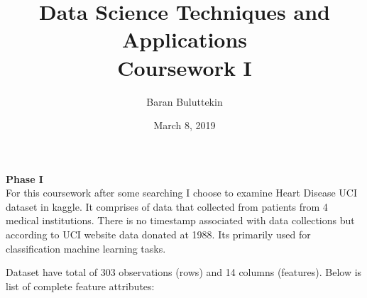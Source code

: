 \documentclass[12pt]{article}
\begin{document}
\author{Baran Buluttekin}
\title{Data Science Techniques and Applications\\Coursework I}
\date{March 8, 2019}
\maketitle

\medskip
\textbf{Phase I}\\
\indent For this coursework after some searching I choose to examine Heart Disease UCI dataset in kaggle. It comprises of data that collected from patients from 4 medical institutions. There is no timestamp associated with data collections but according to UCI website data donated at 1988. Its primarily used for classification machine learning tasks.

Dataset have total of 303 observations (rows) and 14 columns (features). Below is list of complete feature attributes:
\end{document}
